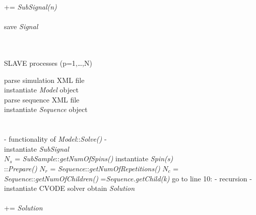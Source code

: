 \documentclass{nic-series}
\begin{document}
\begin{algorithm}[t]
{\begin{minipage}[t]{5.5cm}
\begin{algorithmic}[1]
  	 += {\it SubSignal(n)}\\
  	\ENDFOR\\
  	\STATE save {\it Signal} \\
  	\ \\
 	\end{algorithmic}
	\end{minipage}\hfill
	\begin{minipage}[t]{6cm}
 	\ \\
 	{SLAVE processes (p=1,\dots,N)}
 	\begin{algorithmic}[1]
  	\STATE	parse simulation XML file \\
	\STATE	instantiate {\it Model} object\\
  	\STATE	parse sequence XML file \\
	\STATE	instantiate {\it Sequence} object\\
  	\\
  	\ \\
  	{\tiny\sf - functionality of {\it Model}::{\it Solve()} -}
  	\ \\
        \STATE instantiate {\it SubSignal}\\
        \STATE $N_s$ = {\it SubSample}::{\it getNumOfSpins()}
        \STATE instantiate {\it Spin(s)}\\
        ::{\it Prepare()}
        \STATE $N_r$ = {\it Sequence}::{\it getNumOfRepetitions()}
        \STATE $N_c$ = {\it Sequence}::{\it getNumOfChildren()}
        ={\it Sequence.getChild(k)}
        \STATE go to line {\footnotesize 10:} {{\tiny\sf - recursion -}}
        \STATE instantiate CVODE solver
        \STATE obtain {\it Solution}
	\ENDIF
  	\ENDFOR\\
  	\ENDFOR\\
  	 += {\it Solution}\\
  	\ENDFOR\\
  	\ \\
  	\ \\
  	\ \\
 	\end{algorithmic}
 \end{minipage}\hfill
 }
\end{algorithm}
\end{document}
